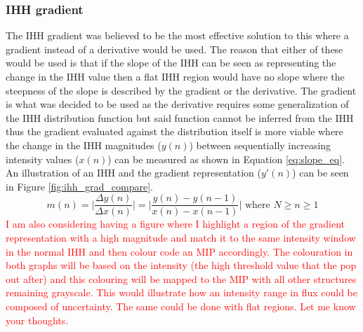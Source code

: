 \subsubsection{IHH gradient} 
The IHH gradient was believed to be the most effective solution to this where a gradient instead of a derivative would be used. The reason that either of these would be used is that if the slope of the IHH can be seen as representing the change in the IHH value then a flat IHH region would have no slope where the steepness of the slope is described by the gradient or the derivative. The gradient is what was decided to be used as the derivative requires some generalization of the IHH distribution function but said function cannot be inferred from the IHH thus the gradient evaluated against the distribution itself is more viable where the change in the IHH magnitudes ($y(n)$) between sequentially increasing intensity values ($x(n)$) can be measured as shown in Equation \ref{eq:slope_eq}. An illustration of an IHH and the gradient representation ($y'(n)$) can be seen in Figure \ref{fig:ihh_grad_compare}.
\begin{equation}\label{eq:slope_eq}
    m(n) = \lvert\frac{\Delta y(n)}{\Delta x(n)}\rvert = \lvert\frac{y(n)-y(n-1)}{x(n)-x(n-1)}\rvert\text{ where $N\geq n\geq 1$}
\end{equation}
\textcolor{red}{I am also considering having a figure where I highlight a region of the gradient representation with a high magnitude and match it to the same intensity window in the normal IHH and then colour code an MIP accordingly. The colouration in both graphs will be based on the intensity (the high threshold value that the pop out after) and this colouring will be mapped to the MIP with all other structures remaining grayscale. This would illustrate how an intensity range in flux could be composed of uncertainty. The same could be done with flat regions. Let me know your thoughts.}
